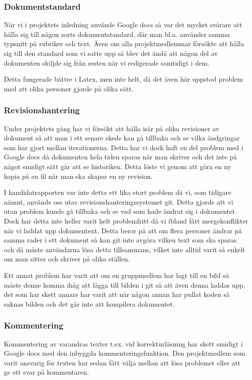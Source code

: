 \subsubsection{Dokumentstandard}
När vi i projektets inledning använde Google docs så var det mycket svårare att hålla sig till någon sorts dokumentstandard, där man bl.a. använder samma typsnitt på rubriker och text. Även om alla projektmedlemmar försökte att hålla sig till den standard som vi satte upp så blev det ändå att någon del av dokumenten skiljde sig från resten när vi redigerade samtidigt i dem.

Detta fungerade bättre i Latex, men inte helt, då det även här uppstod problem med att olika personer gjorde på olika sätt.

\subsubsection{Revisionshantering}
Under projektets gång har vi försökt att hålla isär på olika revisioner av dokument så att man i ett senare skede kan gå tillbaka och se vilka ändgringar som har gjort mellan iterationerna.
Detta har vi dock haft en del problem med i Google docs då dokumenten hela tiden sparas när man skriver och det inte på något smidigt sätt går att se historiken. Detta löste vi genom att göra en ny kopia på en fil när man ska skapar en ny revision.

I kandidatrapporten var inte detta ett lika stort problem då vi, som tidigare nämnt, använde oss utav revisionshanteringssystemet git. Detta gjorde att vi utan problem kunde gå tillbaka och se vad som hade ändrat sig i dokumentet. Dock har detta inte heller varit helt problemfritt då vi ibland fått mergekonflikter när vi laddat upp dokumentext. Detta beror på att om flera personer ändrar på samma rader i ett dokument så kan git inte avgöra vilken text som ska sparas och då måste användarna lösa detta tillsammans, vilket inte alltid varit så enkelt om man sitter och skriver på olika ställen.

Ett annat problem har varit att om en gruppmedlem har lagt till en bild så måste denne komma ihåg att lägga till bilden i git så att även denna laddas upp, det som har skett annars har varit att när någon annan har pullat koden så saknas bilden och det går inte att kompilera dokumentet.

\subsubsection{Kommentering}
Kommentering av varandras texter t.ex. vid korrekturläsning har skett smidigt i Google docs med den inbyggda kommenteringsfunktion. Den projektmedlem som varit ansvarig för texten har sedan fått välja mellan att lösa problemet eller att ge ett svar på kommentaren.

